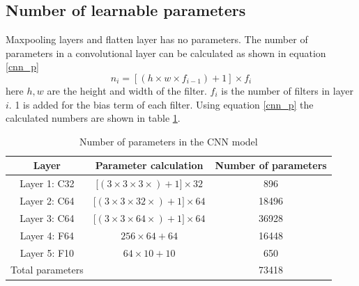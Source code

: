 \documentclass[a4paper, 12pt]{article}
\begin{document}
		\subsection{Number of learnable parameters}
			Maxpooling layers and flatten layer has no parameters. The number of parameters in a convolutional layer  can be calculated as shown in equation \ref{cnn_p}
			\begin{equation}
				n_i = [(h \times w \times f_{i-1}) + 1] \times f_i
				\label{cnn_p}
			\end{equation}
			here $h,w$ are the height and width of the filter. $f_i$ is the number of filters in layer $i$. 1 is added for the bias term of each filter. Using equation \ref{cnn_p} the calculated numbers are shown in table \ref{cnn_paramters}. 
			\begin{table}[h]
				\centering
				\begin{tabular}{|c|c|c|}
					\hline
					Layer & Parameter calculation & Number of parameters \\
					\hline
					Layer 1: C32 & [$(3\times 3\times 3\times)+1]\times 32$ & 896 \\
					Layer 2: C64 & [$(3\times 3\times 32\times)+1]\times 64$ & 18496 \\
					Layer 3: C64 & [$(3\times 3\times 64\times)+1]\times 64$ & 36928 \\
					Layer 4: F64 & $256 \times 64 + 64$ & 16448\\
					Layer 5: F10 & $64 \times 10 + 10$ & 650\\
					\hline
					Total parameters & & 73418\\
					\hline
				\end{tabular}
				\caption{Number of parameters in the CNN model}
				\label{cnn_paramters}
			\end{table}
			
			
\end{document}
